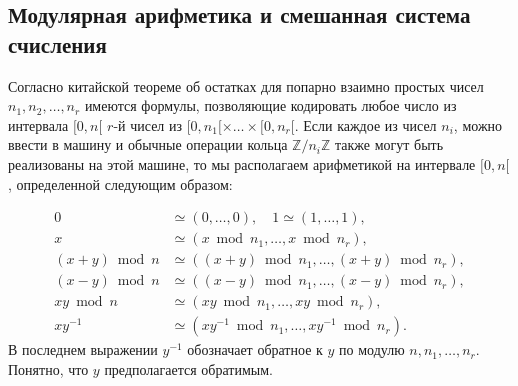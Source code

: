     \subsection{Модулярная арифметика и смешанная система \\счисления}

    \noindent Согласно китайской теореме об остатках для попарно взаимно простых чисел $n_1, n_2, \ldots, n_r$ имеются формулы, позволяющие кодировать любое число из интервала $[0, n [$ $r$-й чисел из $[0, n_1 [\times \ldots \times [0, n_r [$. Если каждое из чисел $n_i$, можно ввести в машину и обычные операции кольца $\mathbb{Z}/n_i\mathbb{Z}$ также могут быть реализованы на этой машине, то мы располагаем арифметикой на интервале $[0, n [$, определенной следующим образом:

    \begin{align*}
    0&\simeq(0,\ldots, 0),\quad 1 \simeq(1, \ldots, 1),\\
    x&\simeq(x \bmod n_1, \ldots, x \bmod n_r),\\
    (x + y) \bmod n &\simeq ((x + y) \bmod n_1, \ldots, (x + y) \bmod n_r),\\
    (x - y) \bmod n &\simeq ((x - y) \bmod n_1, \ldots, (x - y) \bmod n_r),\\
    xy \bmod n &\simeq (xy \bmod n_1, \ldots, xy \bmod n_r),\\
    xy^{-1} &\simeq (xy^{-1} \bmod n_1, \ldots, xy^{-1} \bmod n_r).
    \end{align*}
    В последнем выражении $y^{-1}$ обозначает обратное к $y$ по модулю $n, n_1, \ldots ,n_r$. Понятно, что $y$ предполагается обратимым.

